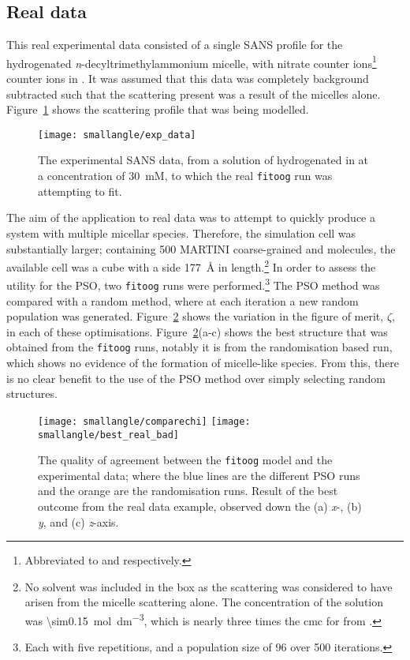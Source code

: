 \subsection{Real data}
\label{sec:real_data}
This real experimental data consisted of a single SANS profile for the hydrogenated \emph{n}-decyltrimethylammonium micelle, with nitrate counter ions\footnote{Abbreviated to  and  respectively.} counter ions in .
It was assumed that this data was completely background subtracted such that the scattering present was a result of the micelles alone.
Figure~\ref{fig:expdata} shows the scattering profile that was being modelled.
%
\begin{figure}[t]
    \centering
    \texttt{[image: smallangle/exp\_data]}
    \caption{The experimental SANS data, from a solution of hydrogenated  in  at a concentration of \SI{30}{\milli M}, to which the real \texttt{fitoog} run was attempting to fit.}
    \label{fig:expdata}
\end{figure}
%

The aim of the application to real data was to attempt to quickly produce a system with multiple micellar species.
Therefore, the simulation cell was substantially larger; containing 500 MARTINI coarse-grained  and  molecules, the available cell was a cube with a side \SI{177}{\angstrom} in length.\footnote{No solvent was included in the box as the scattering was considered to have arisen from the micelle scattering alone. The concentration of the solution was \SI{\sim0.15}{\mol\deci\meter^{-3}}, which is nearly three times the cmc for  from \cite{rodriguez_surface_2007}.}
In order to assess the utility for the PSO, two \texttt{fitoog} runs were performed.\footnote{Each with five repetitions, and a population size of 96 over 500 iterations.}
The PSO method was compared with a random method, where at each iteration a new random population was generated.
Figure~\ref{fig:chi} shows the variation in the figure of merit, $\zeta$, in each of these optimisations.
Figure~\ref{fig:chi}(a-c) shows the best structure that was obtained from the \texttt{fitoog} runs, notably it is from the randomisation based run, which shows no evidence of the formation of micelle-like species.
From this, there is no clear benefit to the use of the PSO method over simply selecting random structures.
%
\begin{figure}
    \centering
    \texttt{[image: smallangle/comparechi]}
    \texttt{[image: smallangle/best\_real\_bad]}
    \caption{The quality of agreement between the \texttt{fitoog} model and the experimental data; where the blue lines are the different PSO runs and the orange are the randomisation runs. Result of the best outcome from the real data example, observed down the (a) \emph{x}-, (b) \emph{y}, and (c) \emph{z}-axis.}
    \label{fig:chi}
\end{figure}
%

